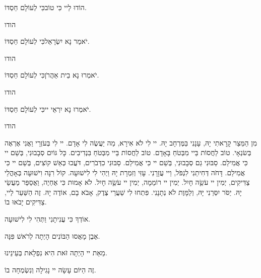 {

\vspace{0.5em}

הוֹדוּ לַיי כִּי טוֹב\hfill כִּי לְעוֹלָם חַסְדּוֹ.


\hfill{\instructionfont
הודו
}

יֹאמַר נָא יִשְׂרָאֵל\hfill כִּי לְעוֹלָם חַסְדּוֹ.

\hfill{\instructionfont
הודו
}

יֹאמְרוּ נָא בֵית אַהֲרֹן\hfill כִּי לְעוֹלָם חַסְדּוֹ.

\hfill{\instructionfont
הודו
}

יֹאמְרוּ נָא יִרְאֵי יי\hfill כִּי לְעוֹלָם חַסְדּוֹ.

\hfill{\instructionfont
הודו
}

\vspace{0.5em}

מִן הַמֵּצַר קָרָאתִי יָהּ, עָנָנִי בַּמֶּרְחָב יָהּ. יי לִי לֹא אִירָא, מַה יַּעֲשֶׂה לִי אָדָם. יי לִי בְּעֹזְרָי וַאֲנִי אֶרְאֶה בְּשׂנְאָי. טוֹב לַחֲסוֹת בַּיי מִבְּטֹחַ בָּאָדָם. טוֹב לַחֲסוֹת בַּיי מִבְּטֹחַ בִּנְדִיבִים. כָּל גּוֹיִם סְבָבוּנִי, בְּשֵׁם יי כִּי אֲמִילַם. סַבּוּנִי גַם סְבָבוּנִי, בְּשֵׁם יי כִּי אֲמִילַם. סַבּוּנִי כִדְּבֹרִים, דֹּעֲכוּ כְּאֵשׁ קוֹצִים, בְּשֵׁם יי כִּי אֲמִילַם. דָּחֹה דְּחִיתַנִי לִנְפֹּל, וַיי עֲזָרָנִי. עָזִּי וְזִמְרָת יָהּ וַיְהִי לִי לִישׁוּעָה. קוֹל רִנָּה וִישׁוּעָה בְּאָהֳלֵי צַדִּיקִים, יְמִין יי עֹשֵָׂה חָיִל. יְמִין יי רוֹמֵמָה, יְמִין יי עֹשֵָׂה חָיִל. לֹא אָמוּת כִּי אֶחְיֶה, וַאֲסַפֵּר מַעֲשֵׂי יָהּ. יַסֹּר יִסְּרַנִי יָּהּ, וְלַמָּוֶת לֹא נְתָנָנִי. פִּתְחוּ לִי שַׁעֲרֵי צֶדֶק, אָבֹא בָם, אוֹדֶה יָהּ. 
זֶה הַשַּׁעַר לַיי, צַדִּיקִים יָבֹאוּ בוֹ. 

\vspace{1em}

\noindent
אוֹדְךָ כִּי עֲנִיתָנִי וַתְּהִי לִי לִישׁוּעָה. 

\noindent
אֶבֶן מָאֲסוּ הַבּוֹנִים הָיְתָה לְרֹאשׁ פִּנָּה. 

\noindent
מֵאֵת יי הָיְתָה זֹּאת הִיא נִפְלָאת בְּעֵינֵינוּ. 

\noindent
זֶה הַיּוֹם עָשָׂה יי נָגִילָה וְנִשְׂמְחָה בוֹ.

\break
}

